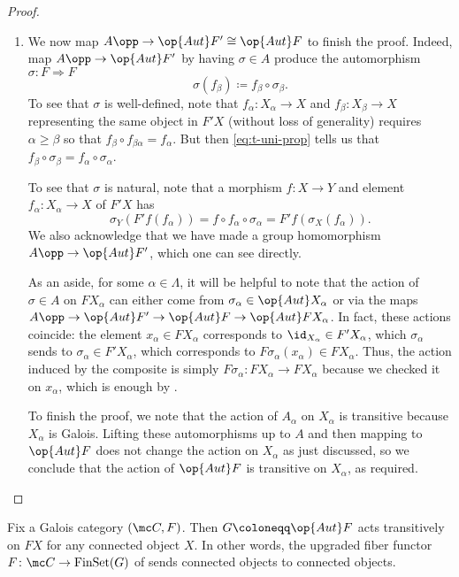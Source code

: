 \documentclass{amsart}
\begin{document}
\begin{proof}
\begin{enumerate}
        \item We now map $A\opp\to\op{Aut}F'\cong\op{Aut}F$ to finish the proof. Indeed, map $A\opp\to\op{Aut}F'$ by having $\sigma\in A$ produce the automorphism $\sigma\colon F\Rightarrow F$
        \[\sigma(f_\beta)\coloneqq f_\beta\circ\sigma_\beta.\]
        To see that $\sigma$ is well-defined, note that $f_\alpha\colon X_\alpha\to X$ and $f_\beta\colon X_\beta\to X$ representing the same object in $F'X$ (without loss of generality) requires $\alpha\ge\beta$ so that $f_\beta\circ f_{\beta\alpha}=f_\alpha$. But then \eqref{eq:t-uni-prop} tells us that $f_\beta\circ\sigma_\beta=f_\alpha\circ\sigma_\alpha$.

        To see that $\sigma$ is natural, note that a morphism $f\colon X\to Y$ and element $f_\alpha\colon X_\alpha\to X$ of $F'X$ has
        \[\sigma_Y(F'f(f_\alpha))=f\circ f_\alpha\circ\sigma_\alpha=F'f(\sigma_X(f_\alpha)).\]
        We also acknowledge that we have made a group homomorphism $A\opp\to\op{Aut}F'$, which one can see directly.
        
        As an aside, for some $\alpha\in\Lambda$, it will be helpful to note that the action of $\sigma\in A$ on $FX_\alpha$ can either come from $\sigma_\alpha\in\op{Aut}X_\alpha$ or via the maps $A\opp\to\op{Aut}F'\to\op{Aut}F\to\op{Aut}FX_\alpha$. In fact, these actions coincide: the element $x_\alpha\in FX_\alpha$ corresponds to ${\id_{X_\alpha}}\in F'X_\alpha$, which $\sigma_\alpha$ sends to $\sigma_\alpha\in F'X_\alpha$, which corresponds to $F\sigma_\alpha(x_\alpha)\in FX_\alpha$. Thus, the action induced by the composite is simply $F\sigma_\alpha\colon FX_\alpha\to FX_\alpha$ because we checked it on $x_\alpha$, which is enough by .

        To finish the proof, we note that the action of $A_\alpha$ on $X_\alpha$ is transitive because $X_\alpha$ is Galois. Lifting these automorphisms up to $A$ and then mapping to $\op{Aut}F$ does not change the action on $X_\alpha$ as just discussed, so we conclude that the action of $\op{Aut}F$ is transitive on $X_\alpha$, as required.
        \qedhere
    \end{enumerate}
\end{proof}
\begin{corollary} \label{cor:connected-to-connected}
    Fix a Galois category $(\mc C,F)$. Then $G\coloneqq\op{Aut}F$ acts transitively on $FX$ for any connected object $X$. In other words, the upgraded fiber functor $F\colon\mc C\to\mathrm{FinSet}(G)$ of  sends connected objects to connected objects.
\end{corollary}
\end{document}
